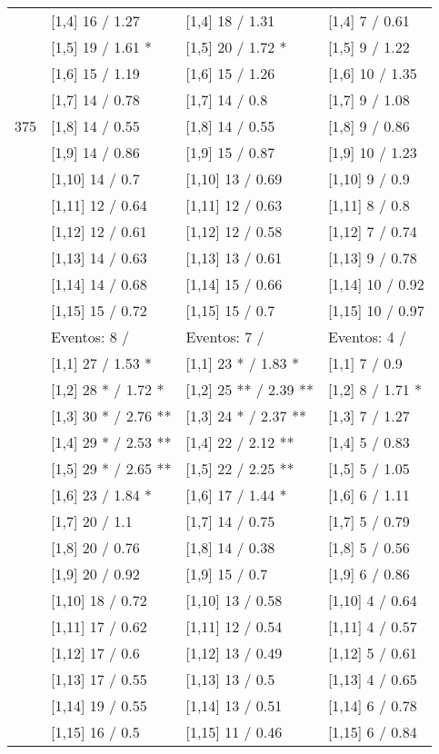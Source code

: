 \begin{table}
\begin{tabular}[t]{llll}
 & {}[1,4] 16  / 1.27 & {}[1,4] 18  / 1.31 & {}[1,4] 7  / 0.61\\
 & {}[1,5] 19  / 1.61 * & {}[1,5] 20  / 1.72 * & {}[1,5] 9  / 1.22\\
 & {}[1,6] 15  / 1.19 & {}[1,6] 15  / 1.26 & {}[1,6] 10  / 1.35\\
 & {}[1,7] 14  / 0.78 & {}[1,7] 14  / 0.8 & {}[1,7] 9  / 1.08\\
375 & {}[1,8] 14  / 0.55 & {}[1,8] 14  / 0.55 & {}[1,8] 9  / 0.86\\
\addlinespace
 & {}[1,9] 14  / 0.86 & {}[1,9] 15  / 0.87 & {}[1,9] 10  / 1.23\\
 & {}[1,10] 14  / 0.7 & {}[1,10] 13  / 0.69 & {}[1,10] 9  / 0.9\\
 & {}[1,11] 12  / 0.64 & {}[1,11] 12  / 0.63 & {}[1,11] 8  / 0.8\\
 & {}[1,12] 12  / 0.61 & {}[1,12] 12  / 0.58 & {}[1,12] 7  / 0.74\\
 & {}[1,13] 14  / 0.63 & {}[1,13] 13  / 0.61 & {}[1,13] 9  / 0.78\\
\addlinespace
 & {}[1,14] 14  / 0.68 & {}[1,14] 15  / 0.66 & {}[1,14] 10  / 0.92\\
 & {}[1,15] 15  / 0.72 & {}[1,15] 15  / 0.7 & {}[1,15] 10  / 0.97\\
 & Eventos:  8 / & Eventos:  7 / & Eventos:  4 /\\
 & {}[1,1] 27  / 1.53 * & {}[1,1] 23 * / 1.83 * & {}[1,1] 7  / 0.9\\
 & {}[1,2] 28 * / 1.72 * & {}[1,2] 25 ** / 2.39 ** & {}[1,2] 8  / 1.71 *\\
\addlinespace
 & {}[1,3] 30 * / 2.76 ** & {}[1,3] 24 * / 2.37 ** & {}[1,3] 7  / 1.27\\
 & {}[1,4] 29 * / 2.53 ** & {}[1,4] 22  / 2.12 ** & {}[1,4] 5  / 0.83\\
 & {}[1,5] 29 * / 2.65 ** & {}[1,5] 22  / 2.25 ** & {}[1,5] 5  / 1.05\\
 & {}[1,6] 23  / 1.84 * & {}[1,6] 17  / 1.44 * & {}[1,6] 6  / 1.11\\
 & {}[1,7] 20  / 1.1 & {}[1,7] 14  / 0.75 & {}[1,7] 5  / 0.79\\
\addlinespace
500 & {}[1,8] 20  / 0.76 & {}[1,8] 14  / 0.38 & {}[1,8] 5  / 0.56\\
 & {}[1,9] 20  / 0.92 & {}[1,9] 15  / 0.7 & {}[1,9] 6  / 0.86\\
 & {}[1,10] 18  / 0.72 & {}[1,10] 13  / 0.58 & {}[1,10] 4  / 0.64\\
 & {}[1,11] 17  / 0.62 & {}[1,11] 12  / 0.54 & {}[1,11] 4  / 0.57\\
 & {}[1,12] 17  / 0.6 & {}[1,12] 13  / 0.49 & {}[1,12] 5  / 0.61\\
\addlinespace
 & {}[1,13] 17  / 0.55 & {}[1,13] 13  / 0.5 & {}[1,13] 4  / 0.65\\
 & {}[1,14] 19  / 0.55 & {}[1,14] 13  / 0.51 & {}[1,14] 6  / 0.78\\
 & {}[1,15] 16  / 0.5 & {}[1,15] 11  / 0.46 & {}[1,15] 6  / 0.84\\
\bottomrule
\end{tabular}
\end{table}
